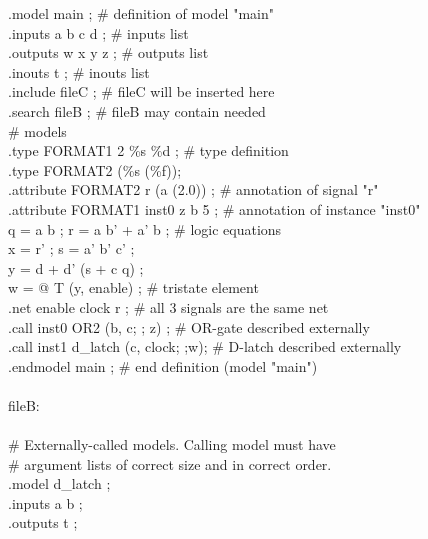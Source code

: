{\begin{pespace}
\begin{tabbing}
      .model main ;       \> \> \> \> \> \>    \# definition of model "main" \\
      .inputs a b c d ;   \> \> \> \> \> \>    \# inputs list \\
      .outputs w x y z ;  \> \> \> \> \> \>    \# outputs list \\
      .inouts t ;         \> \> \> \> \> \>    \# inouts list \\
      .include fileC ;    \> \> \> \> \> \>    \# fileC will be inserted here \\
      .search fileB ;     \> \> \> \> \> \>    \# fileB may contain needed \\
                          \> \> \> \> \> \>    \#  models \\
      .type FORMAT1 2 \%s \%d ;\> \> \> \> \> \> \# type definition \\
      .type FORMAT2 (\%s (\%f)); \\
      .attribute FORMAT2 r (a (2.0)) ;\> \> \> \> \> \>\# annotation of signal "r" \\
      .attribute FORMAT1 inst0 z b 5 ;\> \> \> \> \> \>\# annotation of instance "inst0" \\
      q = a b ;   r = a b' + a' b ; \> \> \> \> \> \>  \# logic equations \\
      x = r'  ;   s = a' b' c'    ; \\
      y = d + d' (s + c q) ; \\
      w = @ T (y, enable) ; \> \> \> \> \> \>  \# tristate element \\
      .net enable clock r ; \> \> \> \> \> \>  \# all 3 signals are the same net \\
      .call inst0 OR2 (b, c; ; z) ; \> \> \> \> \> \> \# OR-gate described externally \\
      .call inst1 d\_latch (c, clock; ;w); \> \> \> \> \> \> \# D-latch described externally \\
      .endmodel main ;      \> \> \> \> \> \>  \# end definition (model "main") \\
 \\
     fileB: \\
 \\
      \#   Externally-called models.  Calling model must have \\
      \#   argument lists of correct size and in correct order. \\
      .model d\_latch ; \\
      .inputs a b ; \\
      .outputs t ; \\

\end{tabbing}
\end{pespace}}
